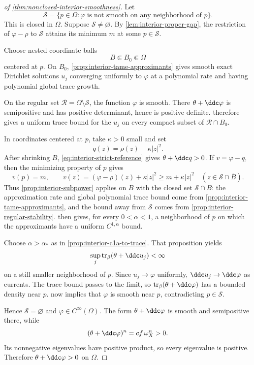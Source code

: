 \begin{proof}[of \cref{thm:nonclosed-interior-smoothness}]
Let
\[
  \mathcal S=\{p\in\Omega:\varphi\text{ is not smooth on any neighborhood of }p\}.
\]
This is closed in $\Omega$. Suppose $\mathcal S\neq\varnothing$. By \cref{lem:interior-proper-gap}, the restriction of $\varphi-\rho$ to $\mathcal S$ attains its minimum $m$ at some $p\in\mathcal S$.

Choose nested coordinate balls
\[
  B\Subset B_0\Subset\Omega
\]
centered at $p$. On $B_0$, \cref{prop:interior-tame-approximants} gives smooth exact Dirichlet solutions $u_j$ converging uniformly to $\varphi$ at a polynomial rate and having polynomial global trace growth.

On the regular set $\mathcal R=\Omega\setminus\mathcal S$, the function $\varphi$ is smooth. There $\theta+\ddc\varphi$ is semipositive and has positive determinant, hence is positive definite.  therefore gives a uniform trace bound for the $u_j$ on every compact subset of $\mathcal R\cap B_0$.

In coordinates centered at $p$, take $\kappa>0$ small and set
\[
  q(z)=\rho(z)-\kappa|z|^2.
\]
After shrinking $B$, \eqref{eq:interior-strict-reference} gives $\theta+\ddc q>0$. If $v=\varphi-q$, then the minimizing property of $p$ gives
\[
  v(p)=m,
  \qquad
  v(z)=(\varphi-\rho)(z)+\kappa|z|^2
  \geq m+\kappa|z|^2
  \quad(z\in\mathcal S\cap\overline B).
\]
Thus \cref{prop:interior-subpower} applies on $B$ with the closed set $\mathcal S\cap\overline B$: the approximation rate and global polynomial trace bound come from \cref{prop:interior-tame-approximants}, and the bound away from $\mathcal S$ comes from \cref{prop:interior-regular-stability}.  then gives, for every $0<\alpha<1$, a neighborhood of $p$ on which the approximants have a uniform $C^{1,\alpha}$ bound.

Choose $\alpha>\alpha_*$ as in \cref{prop:interior-c1a-to-trace}. That proposition yields
\[
  \sup_j\operatorname{tr}_\beta(\theta+\ddc u_j)<\infty
\]
on a still smaller neighborhood of $p$. Since $u_j\to\varphi$ uniformly, $\ddc u_j\to\ddc\varphi$ as currents. The trace bound passes to the limit, so $\operatorname{tr}_\beta(\theta+\ddc\varphi)$ has a bounded density near $p$.  now implies that $\varphi$ is smooth near $p$, contradicting $p\in\mathcal S$.

Hence $\mathcal S=\varnothing$ and $\varphi\in C^\infty(\Omega)$. The form $\theta+\ddc\varphi$ is smooth and semipositive there, while
\[
  (\theta+\ddc\varphi)^n=cf\,\omega_X^n>0.
\]
Its nonnegative eigenvalues have positive product, so every eigenvalue is positive. Therefore $\theta+\ddc\varphi>0$ on $\Omega$.
\end{proof}

